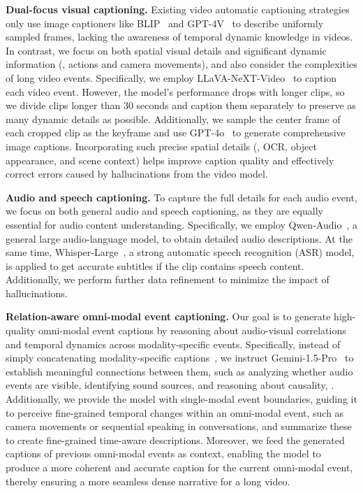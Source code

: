 \noindent \textbf{Dual-focus visual captioning.}
Existing video automatic captioning strategies~\cite{rizve2024vidla,chen2023vast,chen2024sharegpt4video} only use image captioners like BLIP~\cite{li2022blip} and GPT-4V~\cite{Gpt-4v} to describe uniformly sampled frames, lacking the awareness of temporal dynamic knowledge in videos. 
In contrast, we focus on both spatial visual details and significant dynamic information (\ie, actions and camera movements), and also consider the complexities of long video events. 
Specifically, we employ LLaVA-NeXT-Video~\cite{zhang2024llavanextvideo} to caption each video event. 
However, the model's performance drops with longer clips, so we divide clips longer than 30 seconds and caption them separately to preserve as many dynamic details as possible.
Additionally, we sample the center frame of each cropped clip as the keyframe and use GPT-4o~\cite{Gpt-4o} to generate comprehensive image captions. 
Incorporating such precise spatial details (\ie, OCR, object appearance, and scene context) helps improve caption quality and effectively correct errors caused by hallucinations from the video model.

\noindent \textbf{Audio and speech captioning.}
To capture the full details for each audio event, we focus on both general audio and speech captioning, as they are equally essential for audio content understanding.
Specifically, we employ Qwen-Audio~\cite{chu2023qwen}, a general large audio-language model, to obtain detailed audio descriptions. 
At the same time, Whisper-Large~\cite{radford2023robust}, a strong automatic speech recognition (ASR) model, is applied to get accurate subtitles if the clip contains speech content.  
Additionally, we perform further data refinement to minimize the impact of hallucinations. 


\noindent \textbf{Relation-aware omni-modal event captioning.}
Our goal is to generate high-quality omni-modal event captions by reasoning about audio-visual correlations and temporal dynamics across modality-specific events.
Specifically, instead of simply concatenating modality-specific captions~\cite{chen2023vast,liu2024valor}, we instruct Gemini-1.5-Pro~\cite{Gemini} to establish meaningful connections between them, such as analyzing whether audio events are visible, identifying sound sources, and reasoning about causality, \etc.
Additionally, we provide the model with single-modal event boundaries, guiding it to perceive fine-grained temporal changes within an omni-modal event, such as camera movements or sequential speaking in conversations, and summarize these to create fine-grained time-aware descriptions.  
Moreover, we feed the generated captions of previous omni-modal events as context, enabling the model to produce a more coherent and accurate caption for the current omni-modal event, thereby ensuring a more seamless dense narrative for a long video. 



